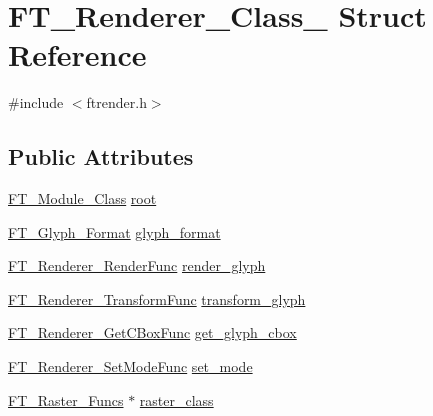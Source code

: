\hypertarget{struct_f_t___renderer___class__}{\section{F\-T\-\_\-\-Renderer\-\_\-\-Class\-\_\- Struct Reference}
\label{struct_f_t___renderer___class__}
}


{\ttfamily \#include $<$ftrender.\-h$>$}

\subsection*{Public Attributes}
\begin{DoxyCompactItemize}
\item 
\hyperlink{ftmodapi_8h_a1bdc5c23cae8b7c61c05966edc4e8343}{F\-T\-\_\-\-Module\-\_\-\-Class} \hyperlink{struct_f_t___renderer___class___a3df4509f1de704596bf4237d6ff8cbd4}{root}
\item 
\hyperlink{ftimage_8h_aeca0d10a27aedecbf96515e0628aff1f}{F\-T\-\_\-\-Glyph\-\_\-\-Format} \hyperlink{struct_f_t___renderer___class___a2c8602452fae27379a6f85bbcb4b525c}{glyph\-\_\-format}
\item 
\hyperlink{ftrender_8h_ada485fdd7f97be351db11403a9b82d9f}{F\-T\-\_\-\-Renderer\-\_\-\-Render\-Func} \hyperlink{struct_f_t___renderer___class___a7a022b8358ce3a06620c62f3542d0d2b}{render\-\_\-glyph}
\item 
\hyperlink{ftrender_8h_a4487d28615fbdd3a10a590601f67c7f7}{F\-T\-\_\-\-Renderer\-\_\-\-Transform\-Func} \hyperlink{struct_f_t___renderer___class___a2aef09ecdabacf5628ef29fb3d179def}{transform\-\_\-glyph}
\item 
\hyperlink{ftrender_8h_a5ad6bf32ce31c620fff9472219af76ed}{F\-T\-\_\-\-Renderer\-\_\-\-Get\-C\-Box\-Func} \hyperlink{struct_f_t___renderer___class___a4f9dc9b6d86504a8d3b04b4e72936e76}{get\-\_\-glyph\-\_\-cbox}
\item 
\hyperlink{ftrender_8h_a2ba073fe01c937ca487c5dc03f0c63bb}{F\-T\-\_\-\-Renderer\-\_\-\-Set\-Mode\-Func} \hyperlink{struct_f_t___renderer___class___a7cfd4795107157aad4f7efcab77a0f64}{set\-\_\-mode}
\item 
\hyperlink{ftimage_8h_aacdff3aaf6e2dea8cfd9c3b90e15728c}{F\-T\-\_\-\-Raster\-\_\-\-Funcs} $\ast$ \hyperlink{struct_f_t___renderer___class___a5af75b9f582f98f9f74dbcbc530c7e88}{raster\-\_\-class}
\end{DoxyCompactItemize}


